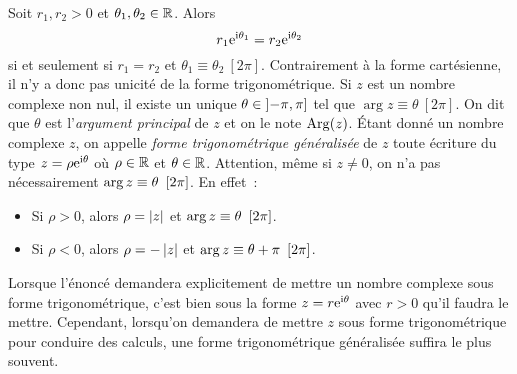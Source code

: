 \documentclass{magnolia}
\begin{document}
\begin{remarques}
\remarque Soit $r_1,r_2>0$ et $\theta_1,\theta_2\in\mathbb{R}$. Alors
  \[r_1{\rm e}^{{\rm i}\theta_1}=r_2{\rm e}^{{\rm i}\theta_2}\]
  si et seulement si $r_1=r_2$ et $\theta_1\equiv\theta_2\ [2\pi]$. Contrairement à la forme cartésienne, il n'y a donc pas unicité de la forme trigonométrique.
\remarque Si $z$ est un nombre complexe non nul, il existe un unique
  $\theta\in\left]-\pi,\pi\right]$ tel que $\arg z\equiv \theta\ [2\pi]$.
  On dit que $\theta$ est l'\emph{argument principal} de $z$ et on le note
  $\operatorname{Arg}(z)$.
\remarque Étant donné un nombre complexe $z$, on appelle
   {\it forme trigonométrique généralisée} de $z$ toute écriture du type
    $z=\rho {\rm e}^{{\rm i}\theta}$ où $\rho\in\mathbb{R}$ et $\theta\in\mathbb{R}$. Attention, même si $z\neq 0$, on n'a pas nécessairement
    $\arg{z}\equiv\theta\ \left[2\pi\right]$. En effet~:
    \begin{itemize}
    \item {Si $\rho>0$}, alors $\rho=\left|z\right|$ et
      $\arg{z}\equiv\theta\ \left[2\pi\right]$.
    \item {Si $\rho<0$}, alors $\rho=-\left|z\right|$ et
      $\arg{z}\equiv\theta+\pi\ \cro{2\pi}$.
    \end{itemize}
  Lorsque l'énoncé demandera explicitement
  de mettre un nombre complexe sous forme trigonométrique, c'est bien
  sous la forme $z=r {\rm e}^{{\rm i}\theta}$ avec $r>0$ qu'il faudra le mettre.
  Cependant, lorsqu'on demandera de mettre $z$ sous forme trigonométrique pour
  conduire des calculs, une forme trigonométrique généralisée suffira le plus
  souvent.
\end{remarques}
\end{document}
